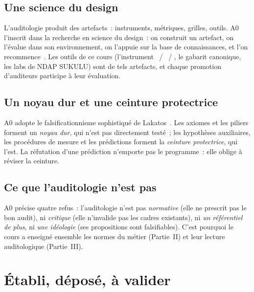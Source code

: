 \subsection{Une science du design}

L'auditologie produit des artefacts~: instruments, métriques, grilles,
outils. A0 l'inscrit dans la recherche en science du design~: on construit
un artefact, on l'évalue dans son environnement, on l'appuie sur la base de
connaissances, et l'on recommence~\cite{hevner2004design}. Les outils de ce
cours (l'instrument \OUI{}~/ \NON{}~/ \NEK{}, le gabarit canonique, les
labs de NDAP SUKULU) sont de tels artefacts, et chaque promotion
d'auditeurs participe à leur évaluation.

\subsection{Un noyau dur et une ceinture protectrice}

A0 adopte le falsificationnisme sophistiqué de Lakatos~\cite{lakatos1970}.
Les axiomes et les piliers forment un \emph{noyau dur}, qui n'est pas
directement testé~; les hypothèses auxiliaires, les procédures de mesure et
les prédictions forment la \emph{ceinture protectrice}, qui l'est. La
réfutation d'une prédiction n'emporte pas le programme~: elle oblige à
réviser la ceinture.

\subsection{Ce que l'auditologie n'est pas}

A0 précise quatre refus~: l'auditologie n'est pas \emph{normative} (elle ne
prescrit pas le bon audit), ni \emph{critique} (elle n'invalide pas les
cadres existants), ni \emph{un référentiel de plus}, ni \emph{une idéologie}
(ses propositions sont falsifiables). C'est pourquoi le cours a enseigné
ensemble les normes du métier (Partie~II) et leur lecture auditologique
(Partie~III).

\separateur

\section{Établi, déposé, à valider}
\label{sec:c15-statut}

